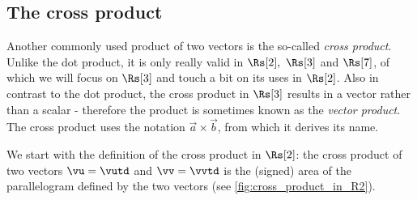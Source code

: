 %
%
%
\subsection{The cross product}
Another commonly used product of two vectors is the so-called \emph{cross product}. Unlike the dot product, it is only really valid in $\Rs[2],\ \Rs[3]$ and $\Rs[7]$, of which we will focus on $\Rs[3]$ and touch a bit on its uses in $\Rs[2]$. Also in contrast to the dot product, the cross product in $\Rs[3]$ results in a vector rather than a scalar - therefore the product is sometimes known as the \emph{vector product}. The cross product uses the notation $\vec{a}\times\vec{b}$, from which it derives its name.

We start with the definition of the cross product in $\Rs[2]$: the cross product of two vectors $\vu=\vutd$ and $\vv=\vvtd$ is the (signed) area of the parallelogram defined by the two vectors (see \autoref{fig:cross_product_in_R2}).

